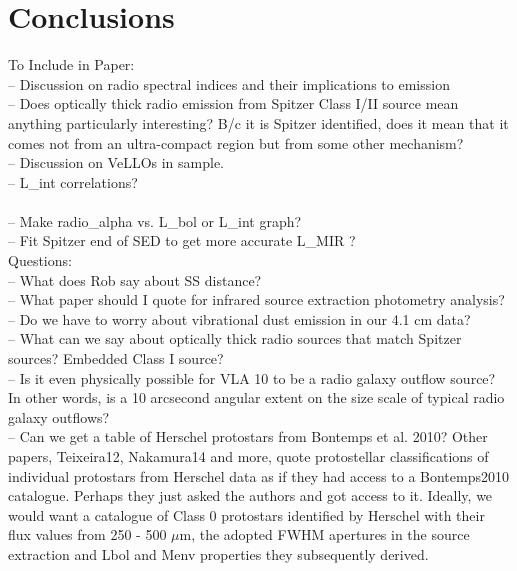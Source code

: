\documentclass[apj]{emulateapj}
\begin{document}
\section{Conclusions}



		
{}



\appendix

{\large To Include in Paper:} \\[.1in]

-- Discussion on radio spectral indices and their implications to emission \\

-- Does optically thick radio emission from Spitzer Class I/II source mean anything particularly interesting? B/c it is Spitzer identified, does it mean that it comes not from an ultra-compact region but from some other mechanism? \\

-- Discussion on VeLLOs in sample. \\

-- L\_int correlations? \\ \\

-- Make radio\_alpha vs. L\_bol or L\_int graph?\\

-- Fit Spitzer end of SED to get more accurate L\_MIR ? \\
 
{\large Questions:} \\[.1in]

-- What does Rob say about SS distance?\\

-- What paper should I quote for infrared source extraction photometry analysis?\\

-- Do we have to worry about vibrational dust emission in our 4.1 cm data?\\

-- What can we say about optically thick radio sources that match Spitzer sources? Embedded Class I source? \\

-- Is it even physically possible for VLA 10 to be a radio galaxy outflow source? In other words, is a 10 arcsecond angular extent on the size scale of typical radio galaxy outflows? \\

-- Can we get a table of Herschel protostars from Bontemps et al. 2010? Other papers, Teixeira12, Nakamura14 and more, quote protostellar classifications of individual protostars from Herschel data as if they had access to a Bontemps2010 catalogue. Perhaps they just asked the authors and got access to it. Ideally, we would want a catalogue of Class 0 protostars identified by Herschel with their flux values from 250 - 500 $\mu$m, the adopted FWHM apertures in the source extraction and Lbol and Menv properties they subsequently derived.\\

\end{document}
